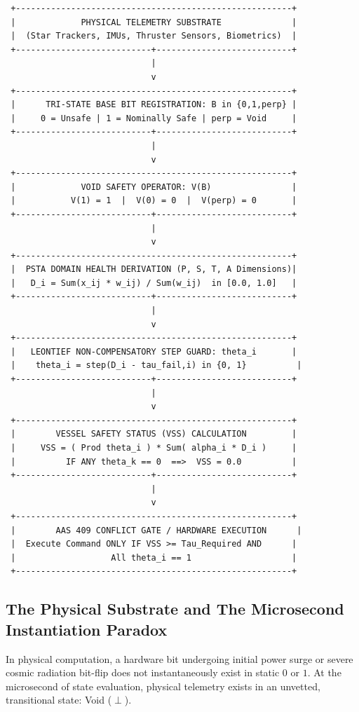 \documentclass[journal]{IEEEtran}
\begin{document}
\begin{verbatim}
 +-------------------------------------------------------+
 |             PHYSICAL TELEMETRY SUBSTRATE              |
 |  (Star Trackers, IMUs, Thruster Sensors, Biometrics)  |
 +---------------------------+---------------------------+
                             |
                             v
 +-------------------------------------------------------+
 |      TRI-STATE BASE BIT REGISTRATION: B in {0,1,perp} |
 |     0 = Unsafe | 1 = Nominally Safe | perp = Void     |
 +---------------------------+---------------------------+
                             |
                             v
 +-------------------------------------------------------+
 |             VOID SAFETY OPERATOR: V(B)                |
 |           V(1) = 1  |  V(0) = 0  |  V(perp) = 0       |
 +---------------------------+---------------------------+
                             |
                             v
 +-------------------------------------------------------+
 |  PSTA DOMAIN HEALTH DERIVATION (P, S, T, A Dimensions)|
 |   D_i = Sum(x_ij * w_ij) / Sum(w_ij)  in [0.0, 1.0]   |
 +---------------------------+---------------------------+
                             |
                             v
 +-------------------------------------------------------+
 |   LEONTIEF NON-COMPENSATORY STEP GUARD: theta_i       |
 |    theta_i = step(D_i - tau_fail,i) in {0, 1}          |
 +---------------------------+---------------------------+
                             |
                             v
 +-------------------------------------------------------+
 |        VESSEL SAFETY STATUS (VSS) CALCULATION         |
 |     VSS = ( Prod theta_i ) * Sum( alpha_i * D_i )     |
 |          IF ANY theta_k == 0  ==>  VSS = 0.0          |
 +---------------------------+---------------------------+
                             |
                             v
 +-------------------------------------------------------+
 |        AAS 409 CONFLICT GATE / HARDWARE EXECUTION      |
 |  Execute Command ONLY IF VSS >= Tau_Required AND      |
 |                   All theta_i == 1                    |
 +-------------------------------------------------------+
\end{verbatim}

\subsection{The Physical Substrate and The Microsecond Instantiation Paradox}
In physical computation, a hardware bit undergoing initial power surge or severe cosmic radiation bit-flip does not instantaneously exist in static $0$ or $1$. At the microsecond of state evaluation, physical telemetry exists in an unvetted, transitional state: Void ($\perp$).
\end{document}
